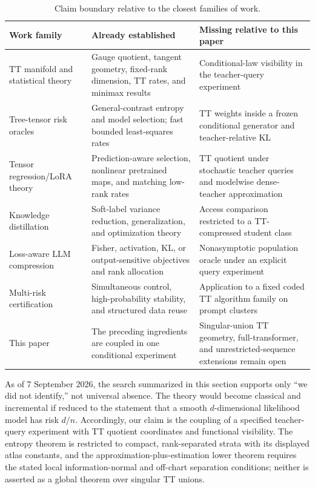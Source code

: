 \begin{table}[t]
\centering
\caption{Claim boundary relative to the closest families of work.}
\label{tab:boundary}
\small
\begin{tabularx}{\textwidth}{@{}>{\raggedright\arraybackslash}p{}>{\raggedright\arraybackslash}X>{\raggedright\arraybackslash}X@{}}
\toprule
Work family & Already established & Missing relative to this paper\\
\midrule
TT manifold and statistical theory & Gauge quotient, tangent geometry, fixed-rank dimension, TT rates, and minimax results & Conditional-law visibility in the teacher-query experiment\\
Tree-tensor risk oracles & General-contrast entropy and model selection; fast bounded least-squares rates & TT weights inside a frozen conditional generator and teacher-relative KL\\
Tensor regression/LoRA theory & Prediction-aware selection, nonlinear pretrained maps, and matching low-rank rates & TT quotient under stochastic teacher queries and modelwise dense-teacher approximation\\
Knowledge distillation & Soft-label variance reduction, generalization, and optimization theory & Access comparison restricted to a TT-compressed student class\\
Loss-aware LLM compression & Fisher, activation, KL, or output-sensitive objectives and rank allocation & Nonasymptotic population oracle under an explicit query experiment\\
Multi-risk certification & Simultaneous control, high-probability stability, and structured data reuse & Application to a fixed coded TT algorithm family on prompt clusters\\
This paper & The preceding ingredients are coupled in one conditional experiment & Singular-union TT geometry, full-transformer, and unrestricted-sequence extensions remain open\\
\bottomrule
\end{tabularx}
\end{table}

As of 7 September 2026, the search summarized in this section supports only ``we did not identify,'' not universal absence. The theory would become classical and incremental if reduced to the statement that a smooth \(d\)-dimensional likelihood model has risk \(d/n\). Accordingly, our claim is the coupling of a specified teacher-query experiment with TT quotient coordinates and functional visibility. The entropy theorem is restricted to compact, rank-separated strata with its displayed atlas constants, and the approximation-plus-estimation lower theorem requires the stated local information-normal and off-chart separation conditions; neither is asserted as a global theorem over singular TT unions.
